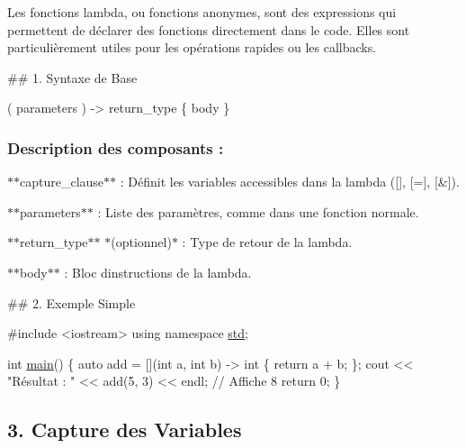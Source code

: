 Les fonctions lambda, ou fonctions anonymes, sont des expressions qui permettent de déclarer des fonctions directement dans le code. Elles sont particulièrement utiles pour les opérations rapides ou les callbacks. 



\#\# 1. Syntaxe de Base 
\begin{DoxyCode}
 ( parameters ) -> return\_type \{ body \}
\end{DoxyCode}


\subsubsection*{Description des composants \+:}


\begin{DoxyItemize}
\item $\ast$$\ast${\ttfamily capture\+\_\+clause}$\ast$$\ast$ \+: Définit les variables accessibles dans la lambda ({\ttfamily \mbox{[}\mbox{]}}, {\ttfamily \mbox{[}=\mbox{]}}, {\ttfamily \mbox{[}\&\mbox{]}}).
\item $\ast$$\ast${\ttfamily parameters}$\ast$$\ast$ \+: Liste des paramètres, comme dans une fonction normale.
\item $\ast$$\ast${\ttfamily return\+\_\+type}$\ast$$\ast$ $\ast$(optionnel)$\ast$ \+: Type de retour de la lambda.
\item $\ast$$\ast${\ttfamily body}$\ast$$\ast$ \+: Bloc d\textquotesingle{}instructions de la lambda. 


\end{DoxyItemize}

\#\# 2. Exemple Simple 
\begin{DoxyCode}
\textcolor{preprocessor}{#include <iostream>}
\textcolor{keyword}{using namespace }\hyperlink{namespacestd}{std};

\textcolor{keywordtype}{int} \hyperlink{htop_8c_a3c04138a5bfe5d72780bb7e82a18e627}{main}() \{
    \textcolor{keyword}{auto} add = [](\textcolor{keywordtype}{int} a, \textcolor{keywordtype}{int} b) -> \textcolor{keywordtype}{int} \{
        \textcolor{keywordflow}{return} a + b;
    \};
    cout << \textcolor{stringliteral}{"Résultat : "} << add(5, 3) << endl; \textcolor{comment}{// Affiche 8}
    \textcolor{keywordflow}{return} 0;
\}
\end{DoxyCode}
 



\subsection*{3. Capture des Variables}


